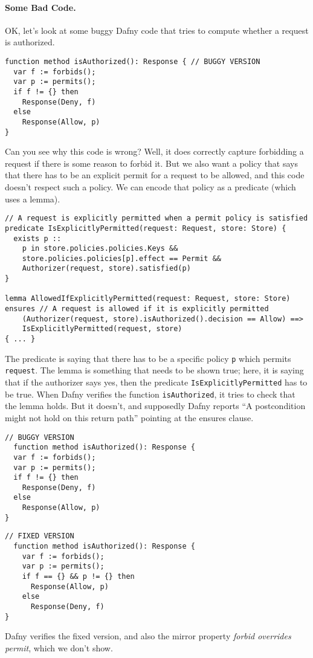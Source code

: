 \documentclass[11pt]{article}
\begin{document}
\paragraph{Some Bad Code.} OK, let's look at some buggy Dafny code that tries to compute whether a request is authorized.
\begin{lstlisting}[language=dafny]
function method isAuthorized(): Response { // BUGGY VERSION
  var f := forbids();
  var p := permits();
  if f != {} then
    Response(Deny, f)
  else
    Response(Allow, p)
}
\end{lstlisting}
Can you see why this code is wrong? Well, it does correctly capture forbidding a request if there is some reason to forbid it. But we also want a policy that says that there has to be an explicit permit for a request to be allowed, and this code doesn't respect such a policy. We can encode that policy as a predicate (which uses a lemma).
\begin{lstlisting}[language=dafny]
// A request is explicitly permitted when a permit policy is satisfied
predicate IsExplicitlyPermitted(request: Request, store: Store) {
  exists p ::
    p in store.policies.policies.Keys &&
    store.policies.policies[p].effect == Permit &&
    Authorizer(request, store).satisfied(p)
}

lemma AllowedIfExplicitlyPermitted(request: Request, store: Store)
ensures // A request is allowed if it is explicitly permitted
	(Authorizer(request, store).isAuthorized().decision == Allow) ==>
	IsExplicitlyPermitted(request, store)
{ ... }
\end{lstlisting}
The predicate is saying that there has to be a specific policy \texttt{p} which permits \texttt{request}.
The lemma is something that needs to be shown true; here, it is saying that if the authorizer says yes,
then the predicate \texttt{IsExplicitlyPermitted} has to be true. When Dafny verifies the
function \texttt{isAuthorized}, it tries to check that the lemma holds. But it doesn't, and
supposedly Dafny reports ``A postcondition might not hold on this return path'' pointing at the
ensures clause.
\begin{center}
\begin{minipage}{.45\textwidth}
\begin{lstlisting}[language=dafny]
  // BUGGY VERSION
  function method isAuthorized(): Response { 
  var f := forbids();
  var p := permits();
  if f != {} then
    Response(Deny, f)
  else
    Response(Allow, p)
}
\end{lstlisting} \end{minipage} \begin{minipage}{.45\textwidth}
  \begin{lstlisting}[language=dafny]
  // FIXED VERSION
  function method isAuthorized(): Response {
    var f := forbids();
    var p := permits();
    if f == {} && p != {} then
      Response(Allow, p)
    else
      Response(Deny, f)
}
  \end{lstlisting}
\end{minipage}
\end{center}
Dafny verifies the fixed version, and also the mirror property \emph{forbid overrides permit}, which we don't show.
\end{document}
